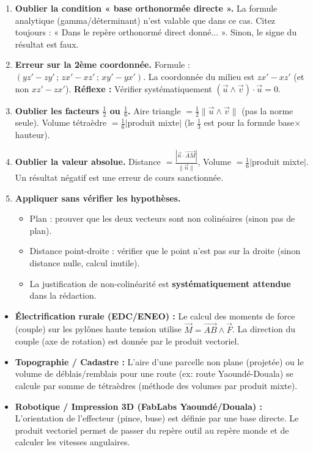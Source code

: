 \documentclass[11pt]{article}
\begin{document}
\begin{attention}
\begin{enumerate}
\item \textbf{Oublier la condition « base orthonormée directe ».} La formule analytique (gamma/déterminant) n'est valable que dans ce cas. Citez toujours : « Dans le repère orthonormé direct donné... ». Sinon, le signe du résultat est faux.
\item \textbf{Erreur sur la 2ème coordonnée.} Formule : $(yz'-zy'\,;\,zx'-xz'\,;\,xy'-yx')$. La coordonnée du milieu est $zx'-xz'$ (et non $xz'-zx'$). \textbf{Réflexe :} Vérifier systématiquement $(\vec{u}\wedge\vec{v})\cdot\vec{u}=0$.
\item \textbf{Oublier les facteurs $\frac12$ ou $\frac16$.} Aire triangle $=\frac12\|\vec{u}\wedge\vec{v}\|$ (pas la norme seule). Volume tétraèdre $=\frac16|$produit mixte$|$ (le $\frac13$ est pour la formule base$\times$hauteur).
\item \textbf{Oublier la valeur absolue.} Distance $=\frac{|\vec{n}\cdot\overrightarrow{AM}|}{\|\vec{n}\|}$, Volume $=\frac16|$produit mixte$|$. Un résultat négatif est une erreur de cours sanctionnée.
\item \textbf{Appliquer sans vérifier les hypothèses.}
  \begin{itemize}
  \item Plan : prouver que les deux vecteurs sont non colinéaires (sinon pas de plan).
  \item Distance point-droite : vérifier que le point n'est pas sur la droite (sinon distance nulle, calcul inutile).
  \item La justification de non-colinéarité est \textbf{systématiquement attendue} dans la rédaction.
  \end{itemize}
\end{enumerate}
\end{attention}

\begin{savaistu}
\begin{itemize}
\item \textbf{Électrification rurale (EDC/ENEO) :} Le calcul des moments de force (couple) sur les pylônes haute tension utilise $\vec{M} = \overrightarrow{AB}\wedge\vec{F}$. La direction du couple (axe de rotation) est donnée par le produit vectoriel.
\item \textbf{Topographie / Cadastre :} L'aire d'une parcelle non plane (projetée) ou le volume de déblais/remblais pour une route (ex: route Yaoundé-Douala) se calcule par somme de tétraèdres (méthode des volumes par produit mixte).
\item \textbf{Robotique / Impression 3D (FabLabs Yaoundé/Douala) :} L'orientation de l'effecteur (pince, buse) est définie par une base directe. Le produit vectoriel permet de passer du repère outil au repère monde et de calculer les vitesses angulaires.
\end{itemize}
\end{savaistu}
\end{document}
